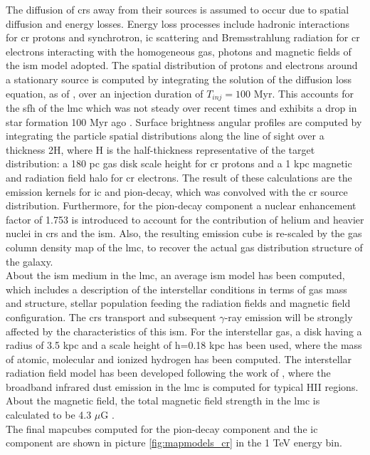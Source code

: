 \documentclass[main.tex]{subfiles}
\begin{document}
The diffusion of \glspl{cr} away from their sources is assumed to occur due to spatial diffusion and energy losses. Energy loss processes include hadronic interactions for \gls{cr} protons and synchrotron, \gls{ic} scattering and Bremsstrahlung radiation for \gls{cr} electrons interacting with the homogeneous gas, photons and magnetic fields of the \gls{ism} model adopted. The spatial distribution of protons and electrons around a stationary source is computed by integrating the solution of the diffusion loss equation, as of \cite{2006diffusionloss}, over an injection duration of $T_{inj} = 100$ Myr. This accounts for the \gls{sfh} of the \gls{lmc} which was not steady over recent times and exhibits a drop in star formation 100 Myr ago \cite{2009SFHofLMC}. Surface brightness angular profiles are computed by integrating the particle spatial distributions along the line of sight over a thickness 2H, where H is the half-thickness representative of the target distribution: a 180 pc gas disk scale height for \gls{cr} protons and a 1 kpc magnetic and radiation field halo for \gls{cr} electrons. The result of these calculations are the emission kernels for \gls{ic} and pion-decay, which was convolved with the \gls{cr} source distribution. Furthermore, for the pion-decay component a nuclear enhancement factor of 1.753 is introduced to account for the contribution of helium and heavier nuclei in \glspl{cr} and the \gls{ism}. Also, the resulting emission cube is re-scaled by the gas column density map of the \gls{lmc}, to recover the actual gas distribution structure of the galaxy.\\
About the \gls{ism} medium in the \gls{lmc}, an average \gls{ism} model has been computed, which includes a description of the interstellar conditions in terms of gas mass and structure, stellar population feeding the radiation fields and magnetic field configuration. The \glspl{cr} transport and subsequent $\gamma$-ray emission will be strongly affected by the characteristics of this \gls{ism}. For the interstellar gas, a disk having a radius of 3.5 kpc and a scale height of h=0.18 kpc has been used, where the mass of atomic, molecular and ionized hydrogen has been computed. The interstellar radiation field model has been developed following the work of \cite{2014DustEMLMCismemission}, where the broadband infrared dust emission in the \gls{lmc} is computed for typical HII regions. About the magnetic field, the total magnetic field strength in the \gls{lmc} is calculated to be 4.3 $\mu$G \cite{2005LMCmagneticfield}.\\
The final mapcubes computed for the pion-decay component and the \gls{ic} component are shown in picture \ref{fig:mapmodels_cr} in the 1 TeV energy bin.
\end{document}
